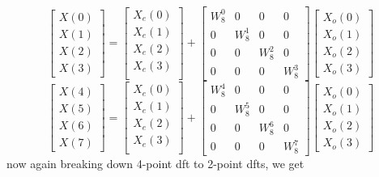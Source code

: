 \documentclass[journal,12pt,twocolumn]{IEEEtran}
\renewcommand\thesection{\arabic{section}}
\begin{document}
\begin{enumerate}[label=\thesection.\arabic*.,ref=\thesection.\theenumi]
\begin{equation}
\begin{bmatrix}
X(0) \\ 
X(1) \\ 
X(2) \\ 
X(3)
\end{bmatrix}
=
\begin{bmatrix}
X_{e}(0) \\ 
X_{e}(1)\\ 
X_{e}(2)\\
X_{e}(3)\\
\end{bmatrix}
+
\begin{bmatrix}
W^{0}_{8} & 0 & 0 & 0\\
0 & W^{1}_{8} & 0 & 0\\
0 & 0 & W^{2}_{8} & 0\\
0 & 0 & 0 & W^{3}_{8}
\end{bmatrix}
\begin{bmatrix}
X_{o}(0) \\ 
X_{o}(1) \\ 
X_{o}(2) \\
X_{o}(3)
\end{bmatrix}
\end{equation}
\begin{equation}
\begin{bmatrix}
X(4) \\ 
X(5) \\ 
X(6) \\ 
X(7)
\end{bmatrix}
=
\begin{bmatrix}
X_{e}(0) \\ 
X_{e}(1)\\ 
X_{e}(2)\\
X_{e}(3)\\
\end{bmatrix}
+
\begin{bmatrix}
W^{4}_{8} & 0 & 0 & 0\\
0 & W^{5}_{8} & 0 & 0\\
0 & 0 & W^{6}_{8} & 0\\
0 & 0 & 0 & W^{7}_{8}
\end{bmatrix}
\begin{bmatrix}
X_{o}(0) \\ 
X_{o}(1) \\ 
X_{o}(2) \\
X_{o}(3)
\end{bmatrix}
\end{equation}
now again breaking down 4-point dft to 2-point dfts, we get

\end{enumerate}
\end{document}

